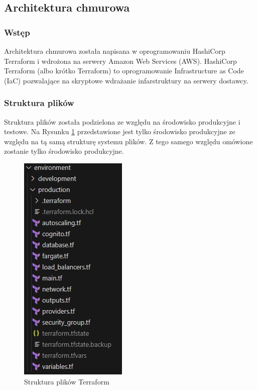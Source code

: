 \documentclass[../../main.tex]{subfiles}
\begin{document}
\subsection{Architektura chmurowa}
    \subsubsection{Wstęp}
        Architektura chmurowa została napisana w oprogramowaniu HashiCorp Terraform i wdrożona na serwery Amazon Web Services (AWS)\cite{aws}. HashiCorp Terraform (albo krótko Terraform)\cite{terraform} to oprogramowanie Infrastructure as Code (IaC) pozwalające na skryptowe wdrażanie infarstruktury na serwery dostawcy.
    \subsubsection{Struktura plików}
        Struktura plików została podzielona ze względu na środowisko produkcyjne i testowe. Na Rysunku \ref{fig:aws-repo-structure} przedstawione jest tylko środowisko produkcyjne ze względu na tą samą strukturę systemu plików. Z tego samego względu omówione zostanie tylko środowisko produkcyjne.
        
        \begin{figure}[ht!]
            \centering
            \includegraphics[height=0.4\pdfpageheight]{images/aws-repo-structure.png}
            \caption{Struktura plików Terraform}
            \label{fig:aws-repo-structure}
        \end{figure}
\end{document}
